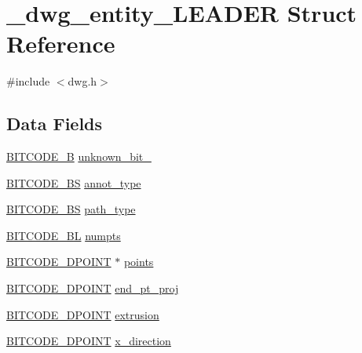 \hypertarget{struct__dwg__entity__LEADER}{\section{\-\_\-dwg\-\_\-entity\-\_\-\-L\-E\-A\-D\-E\-R \-Struct \-Reference}
\label{struct__dwg__entity__LEADER}
}


{\ttfamily \#include $<$dwg.\-h$>$}

\subsection*{\-Data \-Fields}
\begin{DoxyCompactItemize}
\item 
\hyperlink{dwg_8h_ab533b1f62d9086749e3bb5b67e9f224e}{\-B\-I\-T\-C\-O\-D\-E\-\_\-\-B} \hyperlink{struct__dwg__entity__LEADER_a044f2a378d7bb8aa8fef95ff50892644}{unknown\-\_\-bit\-\_}
\item 
\hyperlink{dwg_8h_a94297606fbd4a4ff97e8add284af0809}{\-B\-I\-T\-C\-O\-D\-E\-\_\-\-B\-S} \hyperlink{struct__dwg__entity__LEADER_abf03b7a8796b47f779b095a310abf998}{annot\-\_\-type}
\item 
\hyperlink{dwg_8h_a94297606fbd4a4ff97e8add284af0809}{\-B\-I\-T\-C\-O\-D\-E\-\_\-\-B\-S} \hyperlink{struct__dwg__entity__LEADER_a1ada3c6553cc3d803d1d8b54c1b8d996}{path\-\_\-type}
\item 
\hyperlink{dwg_8h_aebd5f127038868cbabc3d55d91da776c}{\-B\-I\-T\-C\-O\-D\-E\-\_\-\-B\-L} \hyperlink{struct__dwg__entity__LEADER_aad38f878bd96c77a7881c0bc975feea3}{numpts}
\item 
\hyperlink{dwg_8h_a28caf4c2afeb01c45b68490ea6d81113}{\-B\-I\-T\-C\-O\-D\-E\-\_\-D\-P\-O\-I\-N\-T} $\ast$ \hyperlink{struct__dwg__entity__LEADER_a7a8da3628bc71c3feda3b7c8f7dada85}{points}
\item 
\hyperlink{dwg_8h_a28caf4c2afeb01c45b68490ea6d81113}{\-B\-I\-T\-C\-O\-D\-E\-\_\-D\-P\-O\-I\-N\-T} \hyperlink{struct__dwg__entity__LEADER_a03ffa746c22b1e264941f7f163c43c33}{end\-\_\-pt\-\_\-proj}
\item 
\hyperlink{dwg_8h_a28caf4c2afeb01c45b68490ea6d81113}{\-B\-I\-T\-C\-O\-D\-E\-\_\-D\-P\-O\-I\-N\-T} \hyperlink{struct__dwg__entity__LEADER_a4fa17540d49831d08691f00232e1f9f7}{extrusion}
\item 
\hyperlink{dwg_8h_a28caf4c2afeb01c45b68490ea6d81113}{\-B\-I\-T\-C\-O\-D\-E\-\_\-D\-P\-O\-I\-N\-T} \hyperlink{struct__dwg__entity__LEADER_a615ba14a21e3e75438c2e05f30ac46a3}{x\-\_\-direction}

\end{DoxyCompactItemize}
